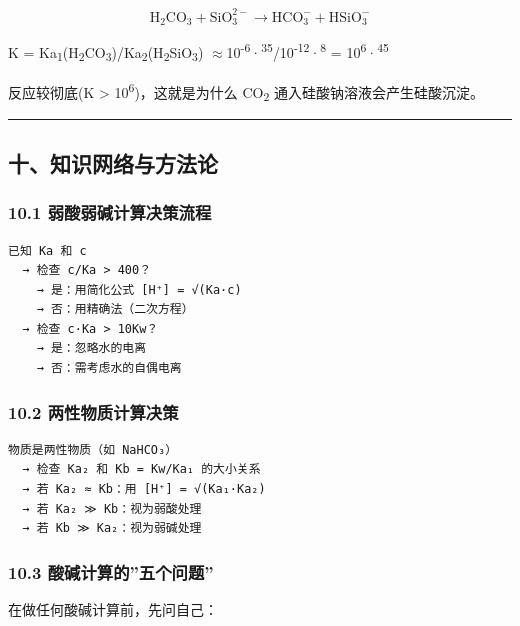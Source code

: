 \documentclass[a4paper,11pt]{ctexart}
\newcommand{\箭}{\ensuremath{\rightarrow}}
\newcommand{\左箭}{\ensuremath{\leftarrow}}
\newcommand{\上箭}{\ensuremath{\uparrow}}
\newcommand{\下箭}{\ensuremath{\downarrow}}
\newcommand{\衡}{\ensuremath{\rightleftharpoons}}
\newcommand{\双箭}{\ensuremath{\leftrightarrow}}
\newcommand{\约等于}{\ensuremath{\approx}}
\newcommand{\小于等于}{\ensuremath{\leq}}
\newcommand{\大于等于}{\ensuremath{\geq}}
\newcommand{\不等于}{\ensuremath{\neq}}
\newcommand{\西格马}{\ensuremath{\sigma}}
\newcommand{\派}{\ensuremath{\pi}}
\begin{document}
\[
\mathrm{H_2CO_3 + SiO_3^{2-} \to HCO_3^- + HSiO_3^-}
\]

K = Ka\textsubscript{1}(H\textsubscript{2}CO\textsubscript{3})/Ka\textsubscript{2}(H\textsubscript{2}SiO\textsubscript{3}) \约等于 10\textsuperscript{-6}·\textsuperscript{35}/10\textsuperscript{-12}·\textsuperscript{8} = 10\textsuperscript{6}·\textsuperscript{45}

反应较彻底(K \textgreater{} 10\textsuperscript{6})，这就是为什么 CO\textsubscript{2} 通入硅酸钠溶液会产生硅酸沉淀。

\begin{center}\rule{0.5\linewidth}{0.5pt}\end{center}

\subsection{十、知识网络与方法论}\label{ux5341ux77e5ux8bc6ux7f51ux7edcux4e0eux65b9ux6cd5ux8bba}

\subsubsection{10.1 弱酸弱碱计算决策流程}\label{ux5f31ux9178ux5f31ux78b1ux8ba1ux7b97ux51b3ux7b56ux6d41ux7a0b}

\begin{verbatim}
已知 Ka 和 c
  → 检查 c/Ka > 400？
    → 是：用简化公式 [H⁺] = √(Ka·c)
    → 否：用精确法（二次方程）
  → 检查 c·Ka > 10Kw？
    → 是：忽略水的电离
    → 否：需考虑水的自偶电离
\end{verbatim}

\subsubsection{10.2 两性物质计算决策}\label{ux4e24ux6027ux7269ux8d28ux8ba1ux7b97ux51b3ux7b56}

\begin{verbatim}
物质是两性物质（如 NaHCO₃）
  → 检查 Ka₂ 和 Kb = Kw/Ka₁ 的大小关系
  → 若 Ka₂ ≈ Kb：用 [H⁺] = √(Ka₁·Ka₂)
  → 若 Ka₂ ≫ Kb：视为弱酸处理
  → 若 Kb ≫ Ka₂：视为弱碱处理
\end{verbatim}

\subsubsection{10.3 酸碱计算的''五个问题''}\label{ux9178ux78b1ux8ba1ux7b97ux7684ux4e94ux4e2aux95eeux9898}

在做任何酸碱计算前，先问自己：
\end{document}

